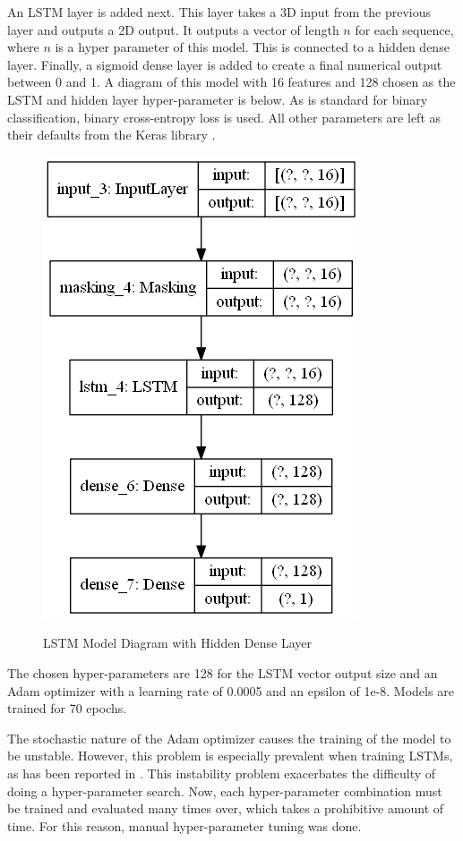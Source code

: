 \documentclass[12pt]{article}
\begin{document}
An LSTM layer is added next. This layer takes a 3D input from the previous layer and outputs a 2D output. It outputs a vector of length $n$ for each sequence, where $n$ is a hyper parameter of this model. This is connected to a hidden dense layer. Finally, a sigmoid dense layer is added to create a final numerical output between 0 and 1. A diagram of this model with 16 features and 128 chosen as the LSTM and hidden layer hyper-parameter is below. As is standard for binary classification, binary cross-entropy loss is used. All other parameters are left as their defaults from the Keras library \cite{keras}.

\begin{figure}[H]
\centering\caption{LSTM Model Diagram with Hidden Dense Layer}
\includegraphics[scale=0.43]{Small Model with dense.png}
\label{LSTM Model Diagram with Hidden Dense Layer}
\end{figure}
The chosen hyper-parameters are 128 for the LSTM vector output size and an Adam optimizer with a learning rate of 0.0005 and an epsilon of 1e-8. Models are trained for 70 epochs.

The stochastic nature of the Adam optimizer causes the training of the model to be unstable. However, this problem is especially prevalent when training LSTMs, as has been reported in \cite{StableReccurantModels, LSTMInstability}. This instability problem exacerbates the difficulty of doing a hyper-parameter search. Now, each hyper-parameter combination must be trained and evaluated many times over, which takes a prohibitive amount of time. For this reason, manual hyper-parameter tuning was done.
\end{document}

